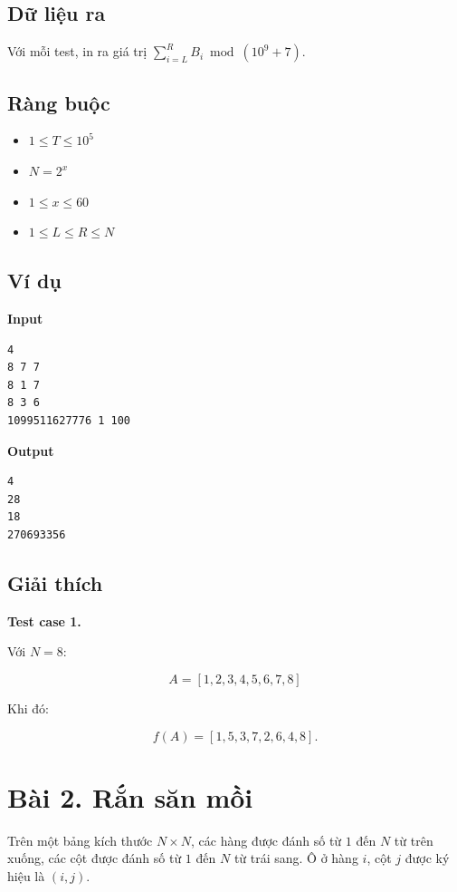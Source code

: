 \subsection*{Dữ liệu ra}

Với mỗi test, in ra giá trị $\sum_{i=L}^{R} B_i \bmod (10^9+7)$.

\subsection*{Ràng buộc}

\begin{itemize}
    \item $1 \le T \le 10^5$
    \item $N = 2^x$
    \item $1 \le x \le 60$
    \item $1 \le L \le R \le N$
\end{itemize}

\subsection*{Ví dụ}

\textbf{Input}
\begin{verbatim}
4
8 7 7
8 1 7
8 3 6
1099511627776 1 100
\end{verbatim}

\textbf{Output}
\begin{verbatim}
4
28
18
270693356
\end{verbatim}

\subsection*{Giải thích}

\textbf{Test case 1.}

Với $N=8$:

\[
A = [1,2,3,4,5,6,7,8]
\]

Khi đó:

\[
f(A) = [1,5,3,7,2,6,4,8].
\]

\newpage

\section*{Bài 2. Rắn săn mồi}

Trên một bảng kích thước $N \times N$, các hàng được đánh số từ $1$ đến $N$ từ trên xuống, các cột được đánh số từ $1$ đến $N$ từ trái sang. Ô ở hàng $i$, cột $j$ được ký hiệu là $(i,j)$.


